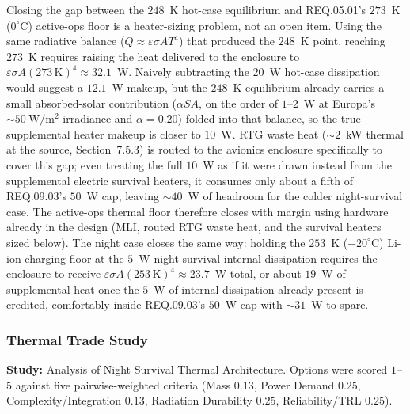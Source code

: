 \documentclass[11pt]{article}
\begin{document}
Closing the gap between the $248$~K hot-case equilibrium and REQ.05.01's $273$~K ($0^\circ$C)
active-ops floor is a heater-sizing problem, not an open item. Using the same radiative balance
($Q \approx \varepsilon\sigma A T^4$) that produced the $248$~K point, reaching $273$~K requires
raising the heat delivered to the enclosure to $\varepsilon\sigma A (273\,\mathrm{K})^4 \approx
32.1$~W. Naively subtracting the $20$~W hot-case dissipation would suggest a $12.1$~W makeup, but
the $248$~K equilibrium already carries a small absorbed-solar contribution ($\alpha S A$, on the
order of $1$--$2$~W at Europa's $\sim 50\ \mathrm{W/m^2}$ irradiance and $\alpha = 0.20$) folded
into that balance, so the true supplemental heater makeup is closer to $10$~W. RTG
waste heat ($\sim 2$~kW thermal at the source, Section~7.5.3) is routed to the avionics
enclosure specifically to cover this gap; even treating the full $10$~W as if it were drawn
instead from the supplemental electric survival heaters, it consumes only about a fifth of
REQ.09.03's $50$~W cap, leaving $\sim 40$~W of headroom for the colder night-survival case.
The active-ops thermal floor therefore closes with margin using hardware already in the design
(MLI, routed RTG waste heat, and the survival heaters sized below). The night case closes the
same way: holding the $253$~K ($-20^\circ$C) Li-ion charging floor at the $5$~W night-survival
internal dissipation requires the enclosure to receive $\varepsilon\sigma A (253\,\mathrm{K})^4
\approx 23.7$~W total, or about $19$~W of supplemental heat once the $5$~W of internal
dissipation already present is credited, comfortably inside REQ.09.03's $50$~W cap with
$\sim 31$~W to spare.

\subsubsection{Thermal Trade Study}
\textbf{Study:} Analysis of Night Survival Thermal Architecture. Options were scored
$1$--$5$ against five pairwise-weighted criteria (Mass $0.13$, Power Demand $0.25$,
Complexity/Integration $0.13$, Radiation Durability $0.25$, Reliability/TRL $0.25$).

\begin{table}[H]
\centering
\small
{}
\caption{Night-survival thermal architecture trade study.}
\label{tab:thermal-trade}
\end{table}
\end{document}
